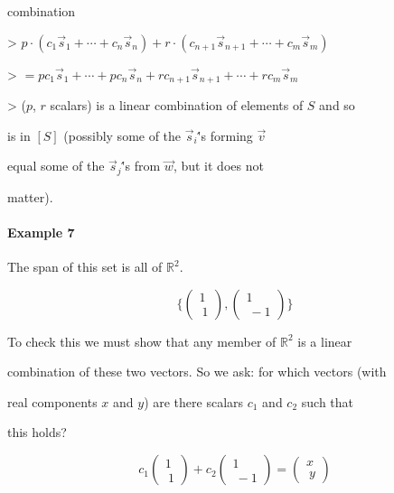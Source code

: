     combination



    >   $p\cdot(c_1\vec{s}_1+\cdots+c_n\vec{s}_n)+

        r\cdot(c_{n+1}\vec{s}_{n+1}+\cdots+c_m\vec{s}_m)$

    >   $=

        pc_1\vec{s}_1+\cdots+pc_n\vec{s}_n

        +rc_{n+1}\vec{s}_{n+1}+\cdots+rc_m\vec{s}_m$

>   ($p$, $r$ scalars) is a linear combination of elements of $S$ and so

    is in $[S]$ (possibly some of the $\vec{s}_i$\''s forming $\vec{v}$

    equal some of the $\vec{s}_j$\''s from $\vec{w}$, but it does not

    matter).



\paragraph{Example 7}



The span of this set is all of $\mathbb{R}^2$.



$$\{\begin{pmatrix} 1 \\\ 1 \end{pmatrix},\begin{pmatrix} 1 \\\ -1 \end{pmatrix}\}$$



To check this we must show that any member of $\mathbb{R}^2$ is a linear

combination of these two vectors. So we ask: for which vectors (with

real components $x$ and $y$) are there scalars $c_1$ and $c_2$ such that

this holds?



$$c_1\begin{pmatrix} 1 \\\ 1 \end{pmatrix}+c_2\begin{pmatrix} 1 \\\ -1 \end{pmatrix}=\begin{pmatrix} x \\\ y \end{pmatrix}$$



